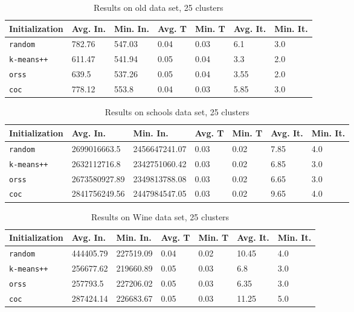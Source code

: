 \begin{table}[h]
	\begin{center}
		\begin{tabular}{|l|l|l|l|l|l|l|}
			\hline
			Initialization & Avg. In. & Min. In. & Avg. T & Min. T & Avg. It. & Min. It.\\\hline
			\texttt{random} & 782.76 & 547.03 & 0.04 & 0.03 & 6.1 & 3.0\\\hline
			\texttt{k-means++} & 611.47 & 541.94 & 0.05 & 0.04 & 3.3 & 2.0\\\hline
			\texttt{orss} & 639.5 & 537.26 & 0.05 & 0.04 & 3.55 & 2.0\\\hline
			\texttt{coc} & 778.12 & 553.8 & 0.04 & 0.03 & 5.85 & 3.0\\\hline
		\end{tabular}
		\caption{Results on old data set, 25 clusters}
		\label{tbl:old25}
	\end{center}
\end{table}

\begin{table}[h]
	\begin{center}
		\begin{tabular}{|l|l|l|l|l|l|l|}
			\hline
			Initialization & Avg. In. & Min. In. & Avg. T & Min. T & Avg. It. & Min. It.\\\hline
			\texttt{random} & 2699016663.5 & 2456647241.07 & 0.03 & 0.02 & 7.85 & 4.0\\\hline
			\texttt{k-means++} & 2632112716.8 & 2342751060.42 & 0.03 & 0.02 & 6.85 & 3.0\\\hline
			\texttt{orss} & 2673580927.89 & 2349813788.08 & 0.03 & 0.02 & 6.65 & 3.0\\\hline
			\texttt{coc} & 2841756249.56 & 2447984547.05 & 0.03 & 0.02 & 9.65 & 4.0\\\hline
		\end{tabular}
		\caption{Results on schools data set, 25 clusters}
		\label{tbl:schools25}
	\end{center}
\end{table}

\begin{table}[h]
	\begin{center}
		\begin{tabular}{|l|l|l|l|l|l|l|}
			\hline
			Initialization & Avg. In. & Min. In. & Avg. T & Min. T & Avg. It. & Min. It.\\\hline
			\texttt{random} & 444405.79 & 227519.09 & 0.04 & 0.02 & 10.45 & 4.0\\\hline
			\texttt{k-means++} & 256677.62 & 219660.89 & 0.05 & 0.03 & 6.8 & 3.0\\\hline
			\texttt{orss} & 257793.5 & 227206.02 & 0.05 & 0.03 & 6.35 & 3.0\\\hline
			\texttt{coc} & 287424.14 & 226683.67 & 0.05 & 0.03 & 11.25 & 5.0\\\hline
		\end{tabular}
		\caption{Results on Wine data set, 25 clusters}
		\label{tbl:Wine25}
	\end{center}
\end{table}

